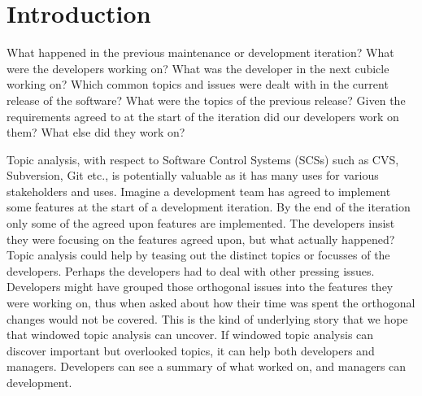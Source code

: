 \documentclass[times, 10pt,twocolumn]{article}
\newcommand{\lda}{Latent Dirichlet Allocation}
\newcommand{\shrinkit}{\vspace*{-.3em}}
\begin{document}
\begin{abstract}

\end{abstract}

\shrinkit
\section{Introduction}
\shrinkit



% 





What happened in the previous maintenance or development iteration? What were the developers
working on? What was the developer in the next cubicle working on?
Which common topics and issues were dealt with in the current
release of the software? What were the topics of the previous release?
Given the requirements agreed to at the start of the iteration did our
developers work on them? What else did they work on?

Topic analysis, with respect to Software Control Systems (SCSs) such
as CVS, Subversion, Git etc., is potentially valuable as it has many
uses for various stakeholders and uses.  Imagine a development team
has agreed to implement some features at the start of a development
iteration. By the end of the iteration only some of the agreed upon
features are implemented. The developers insist they were focusing
 on the features agreed upon, but what actually happened? Topic
analysis could help by teasing out the distinct topics or focusses of
the developers. Perhaps the developers had to deal with other pressing issues.
Developers might have grouped those orthogonal issues into the
features they were working on, thus when asked about how their time
was spent the orthogonal changes would not be covered. This is the
kind of underlying story that we hope that windowed topic analysis can
uncover. If windowed topic analysis can discover important but
overlooked topics, it can help both developers and managers. Developers
can see a summary of what worked on, and managers can development.
\end{document}
